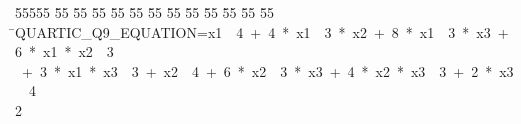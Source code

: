 %
%
\begin{tabbing}
55555 \= 55 \= 55 \= 55 \= 55 \= 55 \= 55 \= 55 \= 55 \= 55 \= 55 \= 55 \= 55 \= \>QUARTIC\_Q9\_EQUATION=x1\ \ 4\ +\ 4\ *\ x1\ \ 3\ *\ x2\ +\ 8\ *\ x1\ \ 3\ *\ x3\ +\ 6\ *\ x1\ *\ x2\ \ 3\\[0pt]
\>\ +\ 3\ *\ x1\ *\ x3\ \ 3\ +\ x2\ \ 4\ +\ 6\ *\ x2\ \ 3\ *\ x3\ +\ 4\ *\ x2\ *\ x3\ \ 3\ +\ 2\ *\ x3\ \ 4\\[0pt]
2\>\end{tabbing}
